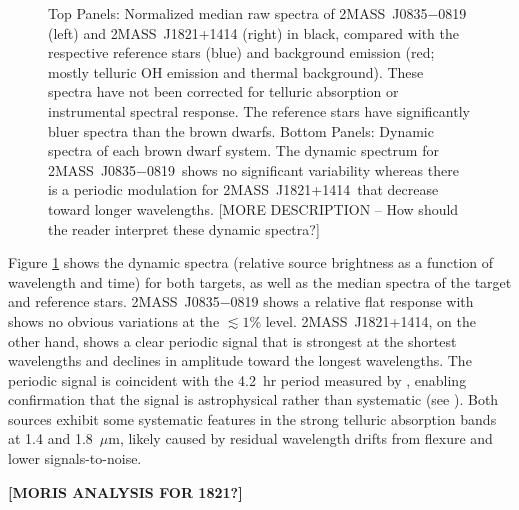 \documentclass[twocolumn]{aastex6}
\newcommand{\sha}{2MASS~J0835$-$0819}
\newcommand{\shb}{2MASS~J1821+1414}
\begin{document}
\begin{figure}[!t]
{	\label{fig:specphot1821}
	}
	\caption{Top Panels: Normalized median raw spectra of {\sha} (left) and {\shb} (right) in black, compared with the respective reference stars (blue) and background emission (red; mostly telluric OH emission and thermal background). These spectra have not been corrected for telluric absorption or instrumental spectral response. The reference stars have significantly bluer spectra than the brown dwarfs. Bottom Panels: Dynamic spectra of each brown dwarf system. The dynamic spectrum for \sha\ shows no significant variability whereas there is a periodic modulation for \shb\ that decrease toward longer wavelengths. [MORE DESCRIPTION -- How should the reader interpret these dynamic spectra?]}
	\label{fig:specphot}
	\vspace{0.1in}
\end{figure} 

Figure \ref{fig:specphot} shows the dynamic spectra (relative source brightness as a function of wavelength and time) for both targets, as well as the median spectra of the target and reference stars.  
{\sha} shows a relative flat response with shows no obvious variations at the $\lesssim1$\% level.
{\shb}, on the other hand, shows a clear periodic signal that is strongest at the shortest wavelengths and declines in amplitude toward the longest wavelengths. The periodic signal is coincident with the 4.2~hr period measured by \citet{2015ApJ...799..154M}, enabling confirmation that the signal is astrophysical rather than systematic (see \citealt{2016ApJ...826..156S}).
Both sources exhibit some systematic features in the strong telluric absorption bands at 1.4 and 1.8~$\mu$m, likely caused by residual wavelength drifts from flexure and lower signals-to-noise.

{\bf [MORIS ANALYSIS FOR 1821?]}
\end{document}
